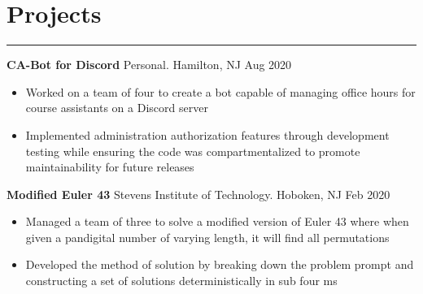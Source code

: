 \documentclass[10pt]{article}
\newcommand{\resumesection}[1]{\vspace{-0.2cm}\section*{#1}\vspace{-0.2cm}\hrule\vspace{0.2cm}}
\begin{document}
\resumesection{Projects}


\textbf{CA-Bot for Discord} Personal. Hamilton, NJ \hfill Aug 2020\par
\begin{itemize}
	\item Worked on a team of four to create a bot capable of managing office hours for course assistants on a Discord server
	\item Implemented administration authorization features through development testing while ensuring the code was compartmentalized to promote maintainability for future releases
\end{itemize}

\textbf{Modified Euler 43} Stevens Institute of Technology. Hoboken, NJ \hfill Feb 2020\par
\begin{itemize}
	\item Managed a team of three to solve a modified version of Euler 43 where when given a pandigital number of varying length, it will find all permutations
	\item Developed the method of solution by breaking down the problem prompt and constructing a set of solutions deterministically in sub four ms 
\end{itemize}

\end{document}
